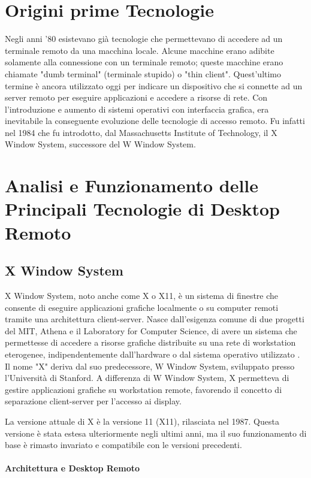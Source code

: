 \documentclass[12pt,a4paper,openright,twoside]{book}
\begin{document}
\section{Origini prime Tecnologie}
Negli anni '80 esistevano già tecnologie che permettevano di accedere ad un terminale remoto da una macchina locale.
Alcune macchine erano adibite solamente alla connessione con un terminale remoto;
queste macchine erano chiamate "dumb terminal" (terminale stupido) o "thin client".
%
Quest'ultimo termine è ancora utilizzato oggi per indicare un dispositivo che si connette ad un server remoto per eseguire applicazioni e accedere a risorse di rete.
Con l'introduzione e aumento di sistemi operativi con interfaccia grafica, era inevitabile la conseguente evoluzione delle tecnologie di accesso remoto.
%
Fu infatti nel 1984 che fu introdotto, dal Massachusetts Institute of Technology, il X Window System, successore del W Window System.

\section{Analisi e Funzionamento delle Principali Tecnologie di Desktop Remoto} 

\subsection{X Window System}
X Window System, noto anche come X o X11, è un sistema di finestre che consente di eseguire applicazioni grafiche localmente o su computer remoti tramite una architettura client-server. 
Nasce dall'esigenza comune di due progetti del MIT,
Athena e il Laboratory for Computer Science,
di avere un sistema che permettesse di accedere a risorse grafiche distribuite su una rete di workstation eterogenee, indipendentemente dall'hardware o dal sistema operativo utilizzato \cite{Scheifler1986}.
%
Il nome "X" deriva dal suo predecessore,
W Window System,
sviluppato presso l'Università di Stanford.
%
A differenza di W Window System, X permetteva di gestire applicazioni grafiche su workstation remote, favorendo il concetto di separazione client-server per l'accesso ai display.

La versione attuale di X è la versione 11 (X11), rilasciata nel 1987.
%
Questa versione è stata estesa ulteriormente negli ultimi anni,
ma il suo funzionamento di base è rimasto invariato e compatibile con le versioni precedenti.

\paragraph{Architettura e Desktop Remoto}
\end{document}
